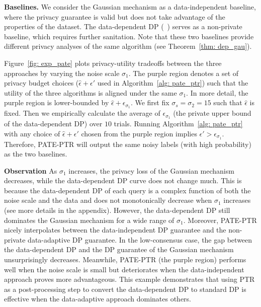 \textbf{Baselines.}
We consider the Gaussian mechanism as a data-independent baseline, where the privacy guarantee is valid but does not take advantage of the properties of the dataset. The data-dependent DP (~\citet{papernot2018scalable}) serves as a non-private baseline, which requires further sanitation.  Note that these two baselines provide different privacy analyses of the same algorithm (see Theorem~\ref{thm: dep_gau}).




Figure~\ref{fig: exp_pate} plots privacy-utility tradeoffs between the three approaches by varying the noise scale $\sigma_1$. The purple region denotes a set of privacy budget choices ($\hat{\epsilon}+\epsilon'$ used in Algorithm~\ref{alg: pate_ptr}) such that the utility of the three algorithms is aligned under the same $\sigma_1$. In more detail, the purple region is lower-bounded by $\hat{\epsilon} +\epsilon_{\sigma_1}$.
We first fix $\sigma_s=\sigma_2=15$ such that $\hat{\epsilon}$ is fixed. Then we empirically calculate the average of $\epsilon_{\sigma_1}$ (the private upper bound of the data-dependent DP) over $10$ trials. Running Algorithm~\ref{alg: pate_ptr} with any choice of $\hat{\epsilon}+\epsilon'$ chosen from the purple region implies  $\epsilon'>\epsilon_{\sigma_1}$. Therefore, PATE-PTR will output the same noisy labels (with high probability) as the two baselines.


\textbf{Observation} 
As $\sigma_1$ increases, the privacy loss of the Gaussian mechanism decreases, while the data-dependent DP curve does not change much. This is because the data-dependent DP of each query is a complex function of both the noise scale and the data and does not monotonically decrease when $\sigma_1$ increases (see more details in the appendix). However, the data-dependent DP still dominates the Gaussian mechanism for a wide range of $\sigma_1$. Moreover, PATE-PTR nicely interpolates between the data-independent DP guarantee and the non-private data-adaptive DP guarantee.  In the low-consensus case, the gap between the data-dependent DP and the DP guarantee of the Gaussian mechanism unsurprisingly decreases. Meanwhile, PATE-PTR (the purple region) performs well when the noise scale is small but deteriorates when the data-independent approach proves more advantageous. 
This example demonstrates that using PTR as a post-processing step to convert the data-dependent DP to standard DP is effective when the data-adaptive approach dominates others.












